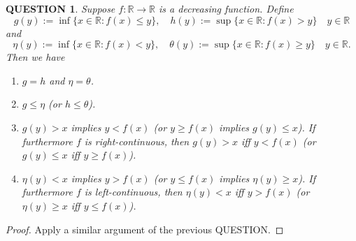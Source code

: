 \documentclass[12pt]{article}
\renewcommand{\(}{\left(}%
\renewcommand{\)}{\right)}%
\renewcommand{\[}{\left[}%
\renewcommand{\]}{\right]}%
\renewcommand{\r}{\mathbb{R}}
\newtheorem{question}{QUESTION}[section]}
\newtheorem{proof}{Proof.}}
\begin{document}
  \begin{question}
  	Suppose $f:\r\to\r$ is a decreasing function. Define
  	\begin{equation*}
  		g(y):=\inf\{x\in\r:f(x)\leq y\},\quad h(y):=\sup\{x\in\r:f(x)>y\}  \quad y\in\r
  	\end{equation*}
  	and
  	\begin{equation*}
  		\eta(y):=\inf\{x\in\r:f(x)< y\},\quad \theta(y):=\sup\{x\in\r:f(x)\geq y\}  \quad y\in\r.
  	\end{equation*}
  	Then we have 
  	\begin{enumerate}
  		\item $g=h$ and $\eta=\theta$.
  		\item $g\leq \eta$ (or $h\leq \theta$).
  		\item $g(y)>x$ implies $y<f(x)$ (or $y\geq f(x)$ implies $g(y)\leq x$). If furthermore $f$ is right-continuous, then $g(y)>x$ iff $y<f(x)$ (or $g(y)\leq x$ iff $y\geq f(x)$).
  		\item $\eta(y)< x$ implies $y> f(x)$ (or $y\leq f(x)$ implies $\eta(y)\geq x$). If furthermore $f$ is left-continuous, then $\eta(y)<x$ iff $y>f(x)$ (or $\eta(y)\geq x$ iff $y\leq f(x)$).
  	\end{enumerate}
  \end{question}
  \begin{proof}
  	Apply a similar argument of the previous QUESTION.
  \end{proof}
  
\end{document}
